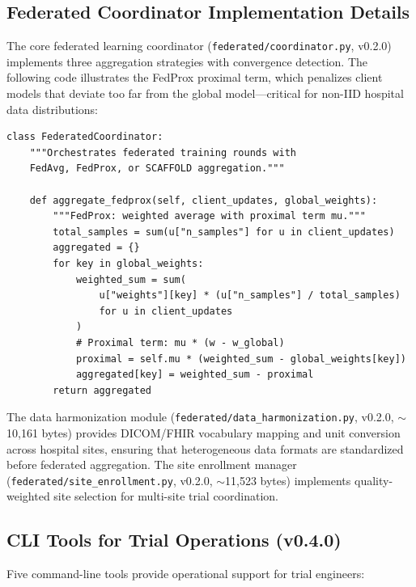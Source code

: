 \subsection{Federated Coordinator Implementation Details}

The core federated learning coordinator (\texttt{federated/coordinator.py}, v0.2.0) implements three aggregation strategies with convergence detection. The following code illustrates the FedProx proximal term, which penalizes client models that deviate too far from the global model---critical for non-IID hospital data distributions:

\begin{lstlisting}[caption={FedProx aggregation with proximal regularization from \texttt{federated/coordinator.py} (v0.2.0)}]
class FederatedCoordinator:
    """Orchestrates federated training rounds with
    FedAvg, FedProx, or SCAFFOLD aggregation."""

    def aggregate_fedprox(self, client_updates, global_weights):
        """FedProx: weighted average with proximal term mu."""
        total_samples = sum(u["n_samples"] for u in client_updates)
        aggregated = {}
        for key in global_weights:
            weighted_sum = sum(
                u["weights"][key] * (u["n_samples"] / total_samples)
                for u in client_updates
            )
            # Proximal term: mu * (w - w_global)
            proximal = self.mu * (weighted_sum - global_weights[key])
            aggregated[key] = weighted_sum - proximal
        return aggregated
\end{lstlisting}

The data harmonization module (\texttt{federated/data\_harmonization.py}, v0.2.0, $\sim$10,161 bytes) provides DICOM/FHIR vocabulary mapping and unit conversion across hospital sites, ensuring that heterogeneous data formats are standardized before federated aggregation. The site enrollment manager (\texttt{federated/site\_enrollment.py}, v0.2.0, $\sim$11,523 bytes) implements quality-weighted site selection for multi-site trial coordination.

\subsection{CLI Tools for Trial Operations (v0.4.0)}

Five command-line tools provide operational support for trial engineers:

